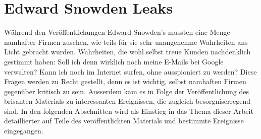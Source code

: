 \section{Edward Snowden Leaks}
Während den Veröffentlichungen Edward Snowden's mussten eine Menge namhafter Firmen zusehen, wie teils für sie sehr unangenehme Wahrheiten ans Licht gebracht wurden. Wahrheiten, die wohl selbst treue Kunden nachdenklich gestimmt haben: Soll ich denn wirklich noch meine E-Mails bei Google verwalten? Kann ich noch im Internet surfen, ohne ausspioniert zu werden? Diese Fragen werden zu Recht gestellt, denn es ist wichtig, selbst namhaften Firmen gegenüber kritisch zu sein. Ausserdem kam es in Folge der Veröffentlichung des brisanten Materials zu interessanten Ereignissen, die zugleich besorgniserregend sind. In den folgenden Abschnitten wird als Einstieg in das Thema dieser Arbeit detaillierter auf Teile des veröffentlichten Materials und bestimmte Ereignisse eingegangen.

